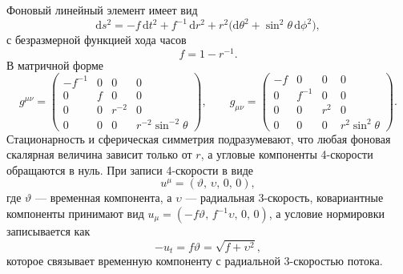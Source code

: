 \documentclass[12pt,a4paper,preprint]{elsarticle}
\begin{document}
            Фоновый линейный элемент имеет вид
            \begin{equation}
                \mathrm{d}s^{2} = -f\,\mathrm{d}t^{2} + f^{-1}\,\mathrm{d}r^{2} + r^{2}\bigl(\mathrm{d}\theta^{2}+\sin^{2}\theta\,\mathrm{d}\phi^{2}\bigr) ,
                \label{eq:schwarzschild-metric}
            \end{equation}
            с безразмерной функцией хода часов
            \begin{equation}
                f = 1 - r^{-1} .
                \label{eq:lapse-function}
            \end{equation}
            В матричной форме
            \begin{equation}
                g^{\mu\nu} =
                \begin{pmatrix}
                    -f^{-1} & 0 & 0 & 0 \\
                    0 & f & 0 & 0 \\
                    0 & 0 & r^{-2} & 0 \\
                    0 & 0 & 0 & r^{-2}\sin^{-2}\theta
                \end{pmatrix} ,
                \qquad
                g_{\mu\nu} =
                \begin{pmatrix}
                    -f & 0 & 0 & 0 \\
                    0 & f^{-1} & 0 & 0 \\
                    0 & 0 & r^{2} & 0 \\
                    0 & 0 & 0 & r^{2}\sin^{2}\theta
                \end{pmatrix} .
                \label{eq:schwarzschild-metric-matrix}
            \end{equation}
            Стационарность и сферическая симметрия подразумевают, что любая фоновая скалярная величина зависит только от $r$, а угловые компоненты 4-скорости обращаются в нуль. При записи 4-скорости в виде
            \begin{equation}
                u^{\mu} = (\vartheta,\,\upsilon,\,0,\,0) ,
                \label{eq:four-velocity-schwarzschild}
            \end{equation}
            где $\vartheta$ --- временная компонента, а $\upsilon$ --- радиальная 3-скорость, ковариантные компоненты принимают вид $u_{\mu}=(-f\vartheta,\,f^{-1}\upsilon,\,0,\,0)$, а условие нормировки записывается как
            \begin{equation}
                -u_{t} = f\vartheta = \sqrt{f+\upsilon^{2}} ,
                \label{eq:four-velocity-norm-schwarzschild}
            \end{equation}
            которое связывает временную компоненту с радиальной 3-скоростью потока.
\end{document}
